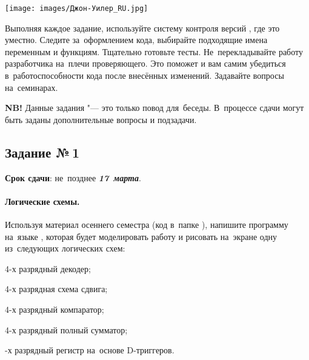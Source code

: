 \documentclass[a4paper,11pt,landscape,notitlepage,oneside,openany,final]{memoir}
\begin{document}



\newcommand{\tabheaderitem}[2]{\multicolumn{1}{#1}{\multirow{2}{*}{#2}}}

\newcommand*{\task}[1]{\makebox[3.0cm]{з. #1}}

\newcommand*{\groupmark}[1]{\textit{группа \textbf{#1}}}
\newcommand*{\groupsection}[1]{\AbstractSection{Группа №\,\textbf{#1}}}

\newcommand*{\pd}{\text{\(+\)\hspace{-3pt}.}}
\newcommand*{\md}{\text{\(-\)\hspace{-3pt}.}}

\newcommand*{\deadline}[1]{\textit{\bfseries\color{DarkRed!60}#1}}
\newcommand*{\notabene}[1]{\textit{\bfseries\color{DarkRed!70}#1}}


\clearpage
\noindent
\texttt{[image: images/Джон-Уилер\_RU.jpg]}


\clearpage
\renewcommand{\rightmark}{Задания}
Выполняя каждое задание, используйте систему контроля версий \git{}, где это уместно. Следите за~оформлением кода, выбирайте подходящие имена переменным и функциям. Тщательно готовьте тесты. Не~перекладывайте работу разработчика на~плечи проверяющего. Это поможет и вам самим убедиться в~работоспособности кода после внесённых изменений. Задавайте вопросы на~семинарах.

\textbf{NB!} Данные задания "--- это только повод для~беседы. В~процессе сдачи могут быть заданы дополнительные вопросы и подзадачи.



\subsection{Задание №\,1}
\textbf{Срок сдачи}: не~позднее \deadline{17~марта}.


\paragraph{Логические схемы.}
Используя материал осеннего семестра (код в~папке ), напишите программу на~языке , которая будет моделировать работу и рисовать на~экране одну из~следующих логических схем:
\begin{enumissue}
    \item 4-х разрядный декодер;
    \item 4-х разрядная схема сдвига;
    \item 4-х разрядный компаратор;
    \item 4-х разрядный полный сумматор;
    \item{}-х разрядный регистр на~основе D-триггеров.
\end{enumissue}
\end{document}
